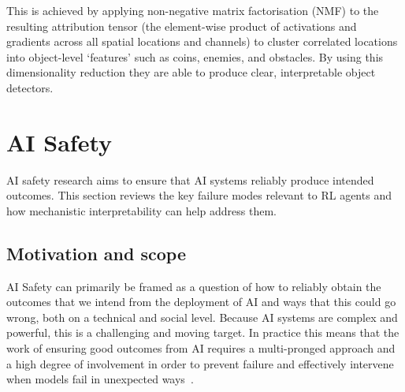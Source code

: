 This is achieved by applying non-negative matrix factorisation (NMF) to the resulting attribution tensor (the element-wise product of activations and gradients across all spatial locations and channels) to cluster correlated locations into object-level `features' such as coins, enemies, and obstacles. By using this dimensionality reduction they are able to produce clear, interpretable object detectors. 





\section{AI Safety}\label{sec:ai_safety}
AI safety research aims to ensure that AI systems reliably produce intended outcomes. This section reviews the key failure modes relevant to RL agents and how mechanistic interpretability can help address them.

\subsection{Motivation and scope}\label{subsec:ai_safety_motivation}
AI Safety can primarily be framed as a question of how to reliably obtain the outcomes that we intend from the deployment of AI and ways that this could go wrong, both on a technical and social level. Because AI systems are complex and powerful, this is a challenging and moving target. In practice this means that the work of ensuring good outcomes from AI requires a multi-pronged approach and a high degree of involvement in order to prevent failure and effectively intervene when models fail in unexpected ways~\citep{hendrycks_2023_overview}.

